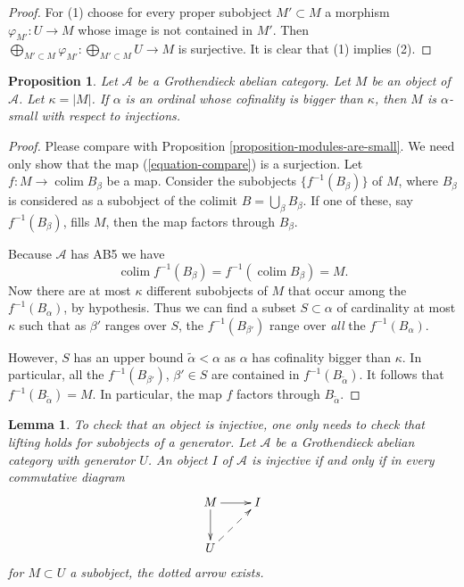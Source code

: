 \documentclass{stacks-project}
\newenvironment{slogan}{\comment}{\endcomment}
\theoremstyle{plain}
\newtheorem{proposition}[subsection]{Proposition}
\newtheorem{lemma}[subsection]{Lemma}
\theoremstyle{definition}
\theoremstyle{remark}
\numberwithin{equation}{subsection}
\def\colim{\mathop{\mathrm{colim}}\nolimits}
\begin{document}
\begin{proof}
For (1) choose for every proper subobject $M' \subset M$ a morphism
$\varphi_{M'} : U \to M$ whose image is not contained in $M'$. Then
$\bigoplus_{M' \subset M} \varphi_{M'} : \bigoplus_{M' \subset M} U \to M$
is surjective. It is clear that (1) implies (2).
\end{proof}

\begin{proposition}
\label{proposition-objects-are-small}
Let $\mathcal{A}$ be a Grothendieck abelian category. Let $M$ be an
object of $\mathcal{A}$. Let $\kappa = |M|$.
If $\alpha$ is an ordinal whose cofinality is bigger than $\kappa$,
then $M$ is $\alpha$-small with respect to injections.
\end{proposition}

\begin{proof}
Please compare with Proposition \ref{proposition-modules-are-small}.
We need only show that the map (\ref{equation-compare}) is a surjection.
Let $f : M \to \colim B_\beta$ be a map.
Consider the subobjects $\{f^{-1}(B_\beta)\}$ of $M$, where $B_\beta$
is considered as a subobject of the colimit $B = \bigcup_\beta B_\beta$.
If one of these, say $f^{-1}(B_\beta)$, fills $M$,
then the map factors through $B_\beta$.

\medskip\noindent
Because $\mathcal{A}$ has AB5 we have
$$
\colim f^{-1}(B_\beta) = f^{-1}\left(\colim B_\beta\right) = M.
$$
Now there are at most $\kappa$ different subobjects of $M$ that occur among
the $f^{-1}(B_\alpha)$, by hypothesis.
Thus we can find a subset $S \subset \alpha$ of cardinality at most
$\kappa$ such that as $\beta'$ ranges over $S$, the
$f^{-1}(B_{\beta'})$ range over \emph{all} the $f^{-1}(B_\alpha)$.

\medskip\noindent
However, $S$ has an upper bound $\widetilde{\alpha} < \alpha$ as
$\alpha$ has cofinality bigger than $\kappa$. In particular, all the
$f^{-1}(B_{\beta'})$, $\beta' \in S$ are contained in
$f^{-1}(B_{\widetilde{\alpha}})$.
It follows that $f^{-1}(B_{\widetilde{\alpha}}) = M$.
In particular, the map $f$ factors through $B_{\widetilde{\alpha}}$.
\end{proof}

\begin{lemma}
\label{lemma-characterize-injective}
\begin{slogan}
To check that an object is injective, one only needs to check that lifting
holds for subobjects of a generator.
\end{slogan}
Let $\mathcal{A}$ be a Grothendieck abelian category with generator $U$.
An object $I$ of $\mathcal{A}$ is injective if and only if in every
commutative diagram
$$
\xymatrix{
M \ar[d] \ar[r] &  I \\
U \ar@{-->}[ru]
}
$$
for $M \subset U$ a subobject, the dotted arrow exists.
\end{lemma}
\end{document}
